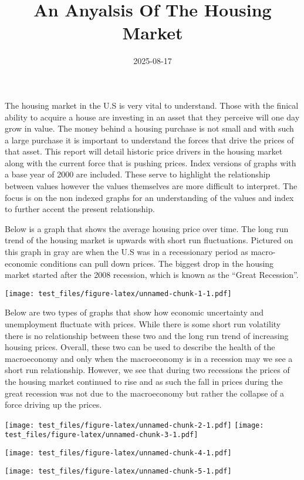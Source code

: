 \documentclass[
]{article}
\title{An Anyalsis Of The Housing Market}
\author{}
\date{\vspace{-2.5em}2025-08-17}
\begin{document}
\maketitle

The housing market in the U.S is very vital to understand. Those with
the finical ability to acquire a house are investing in an asset that
they perceive will one day grow in value. The money behind a housing
purchase is not small and with such a large purchase it is important to
understand the forces that drive the prices of that asset. This report
will detail historic price drivers in the housing market along with the
current force that is pushing prices. Index versions of graphs with a
base year of 2000 are included. These serve to highlight the
relationship between values however the values themselves are more
difficult to interpret. The focus is on the non indexed graphs for an
understanding of the values and index to further accent the present
relationship.

Below is a graph that shows the average housing price over time. The
long run trend of the housing market is upwards with short run
fluctuations. Pictured on this graph in gray are when the U.S was in a
recessionary period as macro-economic conditions can pull down prices.
The biggest drop in the housing market started after the 2008 recession,
which is known as the ``Great Recession''.

\texttt{[image: test\_files/figure-latex/unnamed-chunk-1-1.pdf]}

Below are two types of graphs that show how economic uncertainty and
unemployment fluctuate with prices. While there is some short run
volatility there is no relationship between these two and the long run
trend of increasing housing prices. Overall, these two can be used to
describe the health of the macroeconomy and only when the macroeconomy
is in a recession may we see a short run relationship. However, we see
that during two recessions the prices of the housing market continued to
rise and as such the fall in prices during the great recession was not
due to the macroeconomy but rather the collapse of a force driving up
the prices.

\texttt{[image: test\_files/figure-latex/unnamed-chunk-2-1.pdf]}
\texttt{[image: test\_files/figure-latex/unnamed-chunk-3-1.pdf]}

\texttt{[image: test\_files/figure-latex/unnamed-chunk-4-1.pdf]}

\texttt{[image: test\_files/figure-latex/unnamed-chunk-5-1.pdf]}
\end{document}
